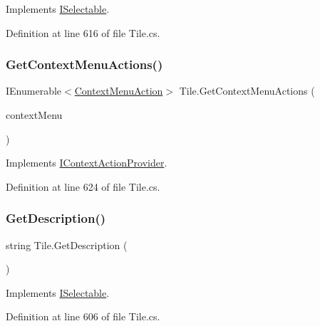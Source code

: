 Implements \hyperlink{interface_i_selectable_a337f81bfa99bb254bb2f7de6a8b5cd4b}{I\+Selectable}.



Definition at line 616 of file Tile.\+cs.

\mbox{\label{class_tile_abb0b61dee4ac0ed5af02165c45a6e688}} 
\subsubsection{\texorpdfstring{Get\+Context\+Menu\+Actions()}{GetContextMenuActions()}}
{\footnotesize\ttfamily I\+Enumerable$<$\hyperlink{class_context_menu_action}{Context\+Menu\+Action}$>$ Tile.\+Get\+Context\+Menu\+Actions (\begin{DoxyParamCaption}\item[{\hyperlink{class_context_menu}{Context\+Menu}}]{context\+Menu }\end{DoxyParamCaption})}



Implements \hyperlink{interface_i_context_action_provider_acb23b31fd7720af55c607a3c12634d1e}{I\+Context\+Action\+Provider}.



Definition at line 624 of file Tile.\+cs.

\mbox{\label{class_tile_a827ddb92a97dc4f34ab12052127f4d3b}} 
\subsubsection{\texorpdfstring{Get\+Description()}{GetDescription()}}
{\footnotesize\ttfamily string Tile.\+Get\+Description (\begin{DoxyParamCaption}{ }\end{DoxyParamCaption})}



Implements \hyperlink{interface_i_selectable_a1d8947a443b6214cff01f2d75c8bc75a}{I\+Selectable}.



Definition at line 606 of file Tile.\+cs.

\mbox{\label{class_tile_a26292fe76574b5c665fb21bca478a28e}} 

